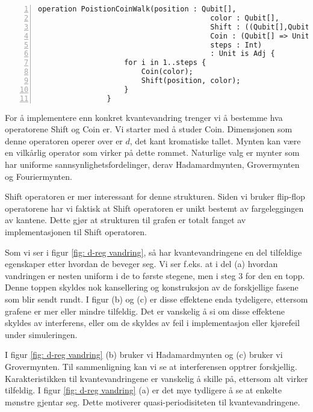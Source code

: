             \begin{Verbatim}[gobble=2, numbers=left, frame=lines,
                framesep=3mm,
                label={[Beginning of code]End of code}]
                operation PoistionCoinWalk(position : Qubit[], 
                                        color : Qubit[], 
                                        Shift : ((Qubit[],Qubit[]) => Unit is Adj), 
                                        Coin : (Qubit[] => Unit is Adj), 
                                        steps : Int) 
                                        : Unit is Adj {
                    for i in 1..steps {
                        Coin(color);
                        Shift(position, color);
                    }
                }
            \end{Verbatim}

            For å implementere enn konkret kvantevandring trenger vi å bestemme hva operatorene Shift og Coin er. Vi starter med å studer Coin. Dimensjonen som denne operatoren operer over er $d$, det kant kromatiske tallet. Mynten kan være en vilkårlig operator som virker på dette rommet. Naturlige valg er mynter som har uniforme sannsynlighetsfordelinger, derav Hadamardmynten, Grovermynten og Fouriermynten.
            
            Shift operatoren er mer interessant for denne strukturen. Siden vi bruker flip-flop operatorene har vi faktisk at Shift operatoren er unikt bestemt av fargeleggingen av kantene. Dette gjør at strukturen til grafen er totalt fanget av implementasjonen til Shift operatoren.

            Som vi ser i figur \ref{fig: d-reg vandring}, så har kvantevandringene en del tilfeldige egenskaper etter hvordan de beveger seg. Vi ser f.eks. at i del (a) hvordan vandringen er nesten uniform i de to første stegene, men i steg 3 for den en topp. Denne toppen skyldes nok kansellering og konstruksjon av de forskjellige fasene som blir sendt rundt. I figur (b) og (c) er disse effektene enda tydeligere, ettersom grafene er mer eller mindre tilfeldig. Det er vanskelig å si om disse effektene skyldes av interferens, eller om de skyldes av feil i implementasjon eller kjørefeil under simuleringen.

            I figur \ref{fig: d-reg vandring} (b) bruker vi Hadamardmynten og (c) bruker vi Grovermynten. Til sammenligning kan vi se at interferensen opptrer forskjellig. Karakteristikken til kvantevandringene er vanskelig å skille på, ettersom alt virker tilfeldig. I figur \ref{fig: d-reg vandring} (a) er det mye tydligere å se at enkelte mønstre gjentar seg. Dette motiverer quasi-periodisiteten til kvantevandringene.

